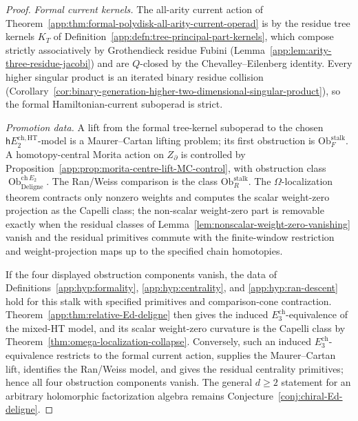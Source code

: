 \begin{proof}
\emph{Formal current kernels.}  The all-arity current action of
Theorem~\ref{app:thm:formal-polydisk-all-arity-current-operad} is by the
residue tree kernels \(K_T\) of
Definition~\ref{app:defn:tree-principal-part-kernels}, which compose
strictly associatively by Grothendieck residue Fubini
(Lemma~\ref{app:lem:arity-three-residue-jacobi}) and are \(Q\)-closed by
the Chevalley--Eilenberg identity.  Every higher singular product is an
iterated binary residue collision
(Corollary~\ref{cor:binary-generation-higher-two-dimensional-singular-product}), so
the formal Hamiltonian-current suboperad is strict.

\emph{Promotion data.}  A lift from the formal tree-kernel suboperad to
the chosen \(\mathsf hE_2^{\mathrm{ch},\mathrm{HT}}\)-model is a
Maurer--Cartan lifting problem; its first obstruction is
\(\mathrm{Ob}_{F}^{\mathrm{stalk}}\).  A homotopy-central Morita action
on \(Z_\partial\) is controlled by
Proposition~\ref{app:prop:morita-centre-lift-MC-control}, with
obstruction class
\(\operatorname{Ob}^{\mathrm{ch}\,E_2}_{\mathrm{Deligne}}\).  The
Ran/Weiss comparison is the class
\(\mathrm{Ob}_{R}^{\mathrm{stalk}}\).  The
\(\Omega\)-localization theorem contracts only nonzero weights and
computes the scalar weight-zero projection as the Capelli class; the
non-scalar weight-zero part is removable exactly when the residual
classes of Lemma~\ref{lem:nonscalar-weight-zero-vanishing} vanish and
the residual primitives commute with the finite-window restriction and
weight-projection maps up to the specified chain homotopies.

If the four displayed obstruction components vanish, the data of
Definitions~\ref{app:hyp:formality}, \ref{app:hyp:centrality}, and
\ref{app:hyp:ran-descent} hold for this stalk with specified primitives
and comparison-cone contraction.
Theorem~\ref{app:thm:relative-Ed-deligne} then gives the induced
\(E_3^{\mathrm{ch}}\)-equivalence of the mixed-HT model, and its scalar
weight-zero curvature is the Capelli class by
Theorem~\ref{thm:omega-localization-collapse}.
Conversely, such an induced \(E_3^{\mathrm{ch}}\)-equivalence restricts to the
formal current action, supplies the Maurer--Cartan lift, identifies the
Ran/Weiss model, and gives the residual centrality primitives; hence all
four obstruction components vanish.
The general \(d\ge2\) statement for an arbitrary holomorphic
factorization algebra remains Conjecture~\ref{conj:chiral-Ed-deligne}.
\end{proof}

